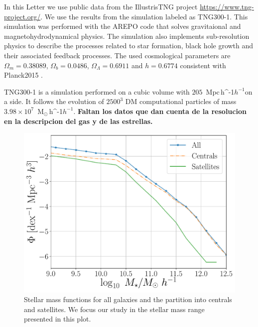 \documentclass[a4paper,fleqn,usenatbib]{mnras}
\newcommand{\Msunh}{\,{\rm M}$_{\odot}$\,\ifmmode h^{-1}\else $h^{-1}$\fi}
\newcommand{\Mpch}{\,{\rm Mpc}\,\ifmmode h^{-1}\else $h^{-1}$\fi}
\begin{document}
In this Letter we use public data from the IllustrisTNG project
\url{https://www.tng-project.org/}. 
We use the results from the simulation labeled as TNG300-1.
This simulation was performed with the AREPO code
\citep{2018MNRAS.473.4077P} that solves gravitaional and
magnetohydrodynamical physics.
The simulation also implements sub-resolution physics to describe the
processes related to star formation, black hole growth and their
associated feedback processes.
The used cosmological parameters are $\Omega_m=0.38089$,
$\Omega_b=0.0486$, $\Omega_\Lambda= 0.6911$ and $h=0.6774$ consistent
with Planck2015 \citep{2016A&A...594A..13P}. 

TNG300-1 is a simulation performed on a cubic volume
with  $205$ \Mpch on a side.
It follows the evolution of $2500^3$ DM computational particles of
mass $3.98 \times 10^7$ \Msunh. 
\textbf{Faltan los datos que dan cuenta de la resolucion en la
  descripcion del gas y de las estrellas.}



\begin{figure}
    \centering
    \includegraphics[width=1\columnwidth]{figuras/Histogramas.pdf}
    \caption{Stellar mass functions for all galaxies and the partition into centrals and satellites. We focus our study in the stellar mass range presented in this plot.}
    \label{fig:stellar_fuction}
\end{figure}
\end{document}
